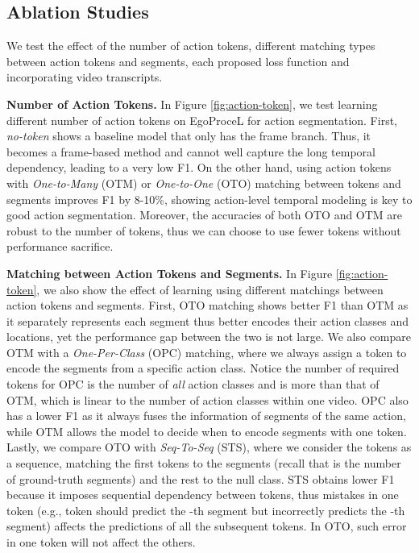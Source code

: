 \documentclass[10pt,twocolumn,letterpaper]{article}
\newcommand{\headline}[1]{\noindent \textbf{#1}}
\newcommand{\0}{\boldsymbol{0}}
\begin{document}
\subsection{Ablation Studies}
We test the effect of the number of action tokens, different matching types between action tokens and segments, each proposed loss function and incorporating video transcripts. 

\vspace{1mm}

\headline{Number of Action Tokens.}
In Figure \ref{fig:action-token}, we test learning different number of action tokens on EgoProceL for action segmentation. 
First, \textit{no-token} shows a baseline model that only has the frame branch. Thus, it becomes a frame-based method and cannot well capture the long temporal dependency, leading to a very low F1.  
On the other hand, using action tokens with \textit{One-to-Many} (OTM) or \textit{One-to-One} (OTO) matching between tokens and segments improves F1 by 8-10\%, showing action-level temporal modeling is key to good action segmentation. Moreover, the accuracies of both OTO and OTM are robust to the number of tokens, thus we can choose to use fewer tokens without performance sacrifice.

\headline{Matching between Action Tokens and Segments.} In Figure \ref{fig:action-token}, we also show the effect of learning using different matchings between action tokens and segments. 
First, OTO matching shows better F1 than OTM as it separately represents each segment thus better encodes their action classes and locations, yet the performance gap between the two is not large. 
We also compare OTM with a \emph{One-Per-Class} (OPC) matching, where we always assign a token to encode the segments from a specific action class. 
Notice the number of required tokens for OPC is the number of \textit{all} action classes and is more than that of OTM, which is linear to the number of action classes within one video. 
OPC also has a lower F1 as it always fuses the information of segments of the same action, while OTM allows the model to decide when to encode segments with one token. 
Lastly, we compare OTO with \textit{Seq-To-Seq} (STS), where we consider the tokens as a sequence, matching the first  tokens to the  segments (recall that  is the number of ground-truth segments) and the rest to the null class. STS obtains lower F1 because it imposes sequential dependency between tokens, thus mistakes in one token (e.g., token  should predict the -th segment but incorrectly predicts the -th segment) affects the predictions of all the subsequent tokens. In OTO, such error in one token will not affect the others.
\end{document}
